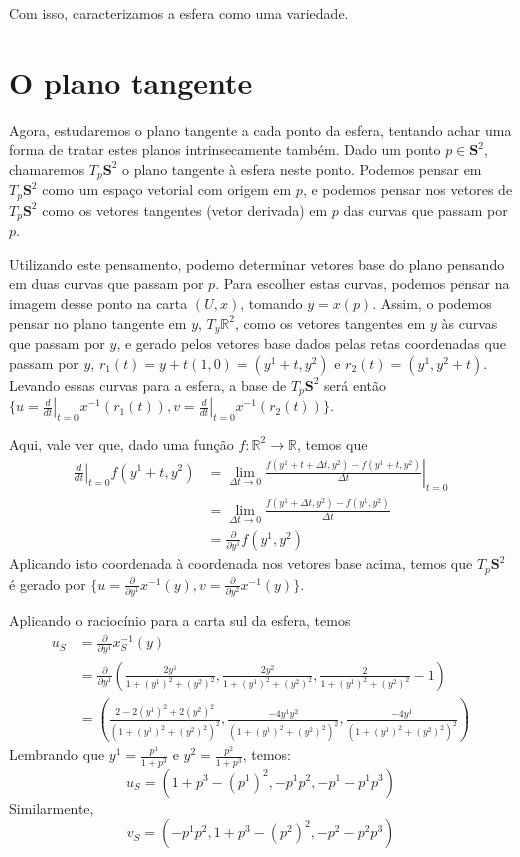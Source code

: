 \documentclass[a4paper,12pt,notitlepage]{article}
\newcommand{\R}{\mathbb{R}}
\renewcommand{\S}{\mathbf{S}}
\begin{document}
	Com isso, caracterizamos a esfera como uma variedade.
	
	\section{O plano tangente}
	Agora, estudaremos o plano tangente a cada ponto da esfera, tentando achar uma forma de tratar estes planos intrinsecamente também. Dado um ponto $p\in \S^2$, chamaremos $T_p\S^2$ o plano tangente à esfera neste ponto. Podemos pensar em $T_p\S^2$ como um espaço vetorial com origem em $p$, e podemos pensar nos vetores de $T_p\S^2$ como os vetores tangentes (vetor derivada) em $p$ das curvas que passam por $p$.
	
	Utilizando este pensamento, podemo determinar vetores base do plano pensando em duas curvas que passam por $p$. Para escolher estas curvas, podemos pensar na imagem desse ponto na carta $(U,x)$, tomando $y=x(p)$. Assim, o podemos pensar no plano tangente em $y$, $T_y\R^2$, como os vetores tangentes em $y$ às curvas que passam por $y$, e gerado pelos vetores base dados pelas retas coordenadas que passam por $y$, $r_1(t)=y+t(1,0)=(y^1+t,y^2)$ e $r_2(t)=(y^1,y^2+t)$. Levando essas curvas para a esfera, a base de $T_p\S^2$ será então $\{u=\left.\frac{d}{dt}\right|_{t=0}x^{-1}(r_1(t)),v=\left.\frac{d}{dt}\right|_{t=0}x^{-1}(r_2(t)) \}$.
	
	Aqui, vale ver que, dado uma função $f:\R^2\to\R$, temos que
	\begin{align*}
	\left.\frac{d}{dt}\right|_{t=0}f(y^1+t,y^2)&=\left.\lim_{\Delta t\to 0}\frac{f(y^1+t+\Delta t,y^2)-f(y^1+t,y^2)}{\Delta t}\right|_{t=0}\\
	&=\lim_{\Delta t\to 0}\frac{f(y^1+\Delta t,y^2)-f(y^1,y^2)}{\Delta t}\\
	&=\frac{\partial}{\partial y^1}f(y^1,y^2)
	\end{align*}
	Aplicando isto coordenada à coordenada nos vetores base acima, temos que $T_p\S^2$ é gerado por $\{u=\frac{\partial}{\partial y^1}x^{-1}(y),v=\frac{\partial}{\partial y^2}x^{-1}(y) \}$.
	
	Aplicando o raciocínio para a carta sul da esfera, temos
	\begin{align*}
	u_S&=\frac{\partial}{\partial y^1}x_S^{-1}(y)\\
	&=\frac{\partial}{\partial y^1}\left(\frac{2y^1}{1+(y^1)^2+(y^2)^2},\frac{2y^2}{1+(y^1)^2+(y^2)^2},\frac{2}{1+(y^1)^2+(y^2)^2}-1\right)\\
	&=\left(\frac{2-2(y^1)^2+2(y^2)^2}{(1+(y^1)^2+(y^2)^2)^2},\frac{-4y^1y^2}{(1+(y^1)^2+(y^2)^2)^2},\frac{-4y^1}{(1+(y^1)^2+(y^2)^2)^2}\right)
	\end{align*}
	Lembrando que $y^1=\frac{p^1}{1+p^3}$ e $y^2=\frac{p^2}{1+p^3}$, temos:
	\begin{equation}
	u_S=(1+p^3-(p^1)^2,-p^1p^2,-p^1-p^1p^3)
	\end{equation}
	Similarmente,
	\begin{equation}
	v_S=(-p^1p^2,1+p^3-(p^2)^2,-p^2-p^2p^3)
	\end{equation}
	
\end{document}
